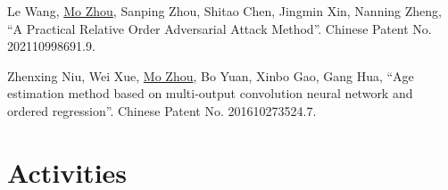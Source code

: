 \documentclass[10pt,margin,line,pifont,palatino,courier]{res}
\begin{document}
\begin{resume}
\begin{enumerate}[noitemsep, leftmargin=*, label={[P0{\arabic*}]}]

\item Le Wang, \underline{Mo Zhou}, Sanping Zhou, Shitao Chen, Jingmin Xin, Nanning Zheng,
	``A Practical Relative Order Adversarial Attack Method''.
	Chinese Patent No. 202110998691.9.

\item Zhenxing Niu, Wei Xue, \underline{Mo Zhou}, Bo Yuan, Xinbo Gao, Gang Hua,
	``Age estimation method based on multi-output convolution neural
	network and ordered regression''. Chinese Patent No. 201610273524.7.

\end{enumerate}

\section{\sc Activities}


\end{resume}
\end{document}
